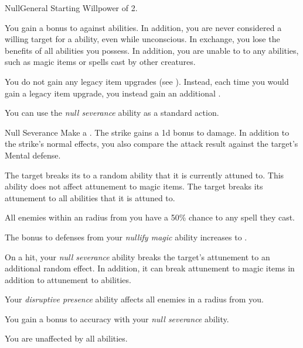     \begin{feat}{Null}{General}
        \featpre Starting Willpower of 2.

         You gain a  bonus to  against  abilities.
        In addition, you are never considered a willing target for a  ability, even while unconscious.
        In exchange, you lose the benefits of all  abilities you possess.
        In addition, you are unable to  to any  abilities, such as magic items or spells cast by other creatures.

         You do not gain any legacy item upgrades (see ).
        Instead, each time you would gain a legacy item upgrade, you instead gain an additional .

         You can use the \textit{null severance} ability as a standard action.
        \begin{apability}{Null Severance}
            Make a .
            The strike gains a \plus1d bonus to damage.
            In addition to the strike's normal effects, you also compare the attack result against the target's Mental defense.

            \hit The target breaks its  to a random ability that it is currently attuned to.
            This ability does not affect attunement to magic items.
            \crit The target breaks its attunement to all abilities that it is attuned to.
        \end{apability}

         All enemies within an \areamed radius from you have a 50\% chance to  any spell they cast.

         The bonus to defenses from your \textit{nullify magic} ability increases to .

         On a hit, your \textit{null severance} ability breaks the target's attunement to an additional random effect.
        In addition, it can break attunement to magic items in addition to attunement to abilities.

         Your \textit{disruptive presence} ability affects all enemies in a \arealarge radius  from you.

         You gain a  bonus to accuracy with your \textit{null severance} ability.

         You are unaffected by all  abilities.
    \end{feat}

